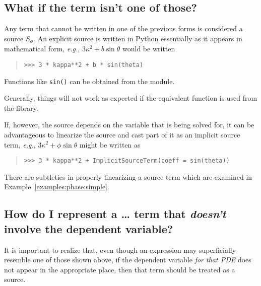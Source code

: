             \subsection{What if the term isn't one of those?}
            Any term that cannot be written in one of the previous
            forms is considered a source $S_{\phi}$. An explicit
            source is written in Python essentially as it appears in
            mathematical form, \emph{e.g.}, $3\kappa^2 + b \sin
            \theta$ would be written
            \begin{quote}
\begin{verbatim}
>>> 3 * kappa**2 + b * sin(theta)
\end{verbatim}
            \end{quote}
            
            \begin{reSTadmonition}[Note]
                Functions like \verb+sin()+ can be obtained from the
                 module.
                \begin{reSTadmonition}[Warning]
                    Generally, things will not work as expected if the
                    equivalent function is used from the \Numeric{}
                    library.
                \end{reSTadmonition}
            \end{reSTadmonition}
            
            If, however, the source depends on the variable that is being solved for,
            it can be advantageous to linearize the source and cast part of it as an
            implicit source term, \emph{e.g.}, $3\kappa^2 + \phi \sin \theta$
            might be written as
            \begin{quote}
\begin{verbatim}
>>> 3 * kappa**2 + ImplicitSourceTerm(coeff = sin(theta))
\end{verbatim}
            \end{quote}
            
            \begin{reSTadmonition}[Warning]
                There are subtleties in properly linearizing a source term
                which are examined in
                Example~\ref{examples:phase:simple}.
            \end{reSTadmonition}

            \subsection{How do I represent a \dots{} term that 
            \emph{doesn't} involve the dependent variable?}
            It is important to realize that, even though an expression may
            superficially resemble one of those shown above, if the
            dependent variable \emph{for that PDE} does not appear in the
            appropriate place, then that term should be treated as a source.

